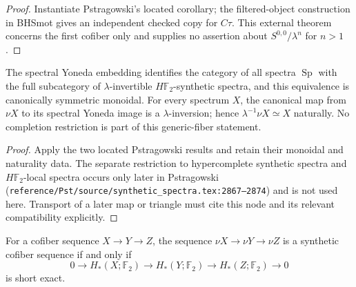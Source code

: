 \begin{proof}
  Instantiate Pstragowski's located corollary; the filtered-object construction
  in BHSmot gives an independent checked copy for $C\tau$.  This external
  theorem concerns the first cofiber only and supplies no assertion about
  $S^{0,0}/\lambda^n$ for $n>1$.
\end{proof}

\begin{theorem}
  \label{thm:external-lambda-inversion}
  \notready
  The spectral Yoneda embedding identifies the category of all spectra
  $\operatorname{Sp}$ with the full subcategory of $\lambda$-invertible
  $H\mathbb F_2$-synthetic spectra, and this equivalence is canonically
  symmetric monoidal.  For every spectrum $X$, the canonical map from $\nu X$
  to its spectral Yoneda image is a $\lambda$-inversion; hence
  $\lambda^{-1}\nu X\simeq X$ naturally.  No completion restriction is part of
  this generic-fiber statement.
\end{theorem}

\begin{proof}
  Apply the two located Pstragowski results and retain their monoidal and
  naturality data.  The separate restriction to hypercomplete synthetic
  spectra and $H\mathbb F_2$-local spectra occurs only later in Pstragowski
  (\texttt{reference/Pst/source/synthetic\_spectra.tex:2867--2874}) and is not
  used here.  Transport of a later map or triangle must cite this node and its
  relevant compatibility explicitly.
\end{proof}

\begin{theorem}
  \label{thm:external-nu-cofiber-criterion}
  \notready
  For a cofiber sequence $X\to Y\to Z$, the sequence
  $\nu X\to\nu Y\to\nu Z$ is a synthetic cofiber sequence if and only if
  \[
    0\to H_*(X;\mathbb F_2)\to H_*(Y;\mathbb F_2)
      \to H_*(Z;\mathbb F_2)\to0
  \]
  is short exact.
\end{theorem}

